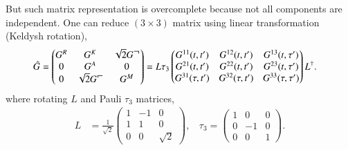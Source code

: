 But such matrix representation is overcomplete because not all components are independent. One can reduce $(3 \times 3)$ matrix using linear transformation (Keldysh rotation),
\begin{align}
 \hat{G}
  &=
   \begin{pmatrix}
    G^{R} & G^{K} & \sqrt{2} G^{\lh} \\
    0 & G^{A} & 0 \\
    0 & \sqrt{2} G^{\rh} & G^{M}
   \end{pmatrix}
   =L\tau_3
   \begin{pmatrix}
    G^{11}(t,t') & G^{12}(t,t') & G^{13}(t,\tau ') \\
    G^{21}(t,t') & G^{22}(t,t') & G^{23}(t,\tau ') \\
    G^{31}(\tau,t') & G^{32}(\tau,t') & G^{33}(\tau,\tau')
   \end{pmatrix}L^{\dagger}.
 \label{G_3x3}
\end{align}
where rotating $L$ and Pauli $\tau_3$ matrices,
\begin{align}
 L
  &=\frac{1}{\sqrt{2}}
   \begin{pmatrix}
    1 & -1 & 0 \\
    1 & 1 & 0 \\
    0 & 0 & \sqrt{2}
   \end{pmatrix}
    , \: \: \: \: \tau_3=
   \begin{pmatrix}
    1 & 0 & 0 \\
    0 & -1 & 0 \\
    0 & 0 & 1
   \end{pmatrix}.
 \label{rotating_pauli}
\end{align}

